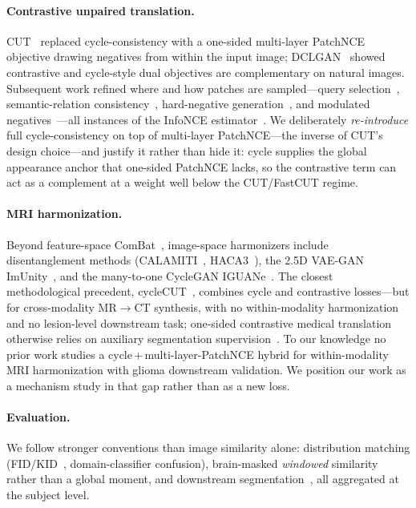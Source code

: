 \documentclass[runningheads]{llncs}
\begin{document}
\paragraph{Contrastive unpaired translation.}
CUT~\cite{park2020cut} replaced cycle-consistency with a one-sided multi-layer
PatchNCE objective drawing negatives from within the input image;
DCLGAN~\cite{han2021dclgan} showed contrastive and cycle-style dual objectives
are complementary on natural images. Subsequent work refined where and how
patches are sampled---query selection~\cite{hu2022qsattn}, semantic-relation
consistency~\cite{jung2022src}, hard-negative generation~\cite{wang2021negcut},
and modulated negatives~\cite{zhan2022monce}---all instances of the InfoNCE
estimator~\cite{oord2018cpc}. We deliberately \emph{re-introduce} full
cycle-consistency on top of multi-layer PatchNCE---the inverse of CUT's design
choice---and justify it rather than hide it: cycle supplies the global appearance
anchor that one-sided PatchNCE lacks, so the contrastive term can act as a
complement at a weight well below the CUT/FastCUT regime.

\paragraph{MRI harmonization.}
Beyond feature-space ComBat~\cite{fortin2017combat}, image-space harmonizers
include disentanglement methods (CALAMITI~\cite{zuo2021calamiti},
HACA3~\cite{zuo2023haca3}), the 2.5D VAE-GAN ImUnity~\cite{cackowski2023imunity},
and the many-to-one CycleGAN IGUANe~\cite{roca2024iguane}. The closest
methodological precedent, cycleCUT~\cite{wang2022cyclecut}, combines cycle and
contrastive losses---but for cross-modality MR$\to$CT synthesis, with no
within-modality harmonization and no lesion-level downstream task; one-sided
contrastive medical translation otherwise relies on auxiliary segmentation
supervision~\cite{seibel2024oct}. To our knowledge no prior work studies a
cycle\,$+$\,multi-layer-PatchNCE hybrid for within-modality MRI harmonization
with glioma downstream validation. We position our work as a mechanism study in
that gap rather than as a new loss.

\paragraph{Evaluation.}
We follow stronger conventions than image similarity alone: distribution matching
(FID/KID~\cite{heusel2017fid,binkowski2018kid}, domain-classifier confusion),
brain-masked \emph{windowed} similarity rather than a global moment, and downstream
segmentation~\cite{isensee2021nnunet}, all aggregated at the subject level.
\end{document}
